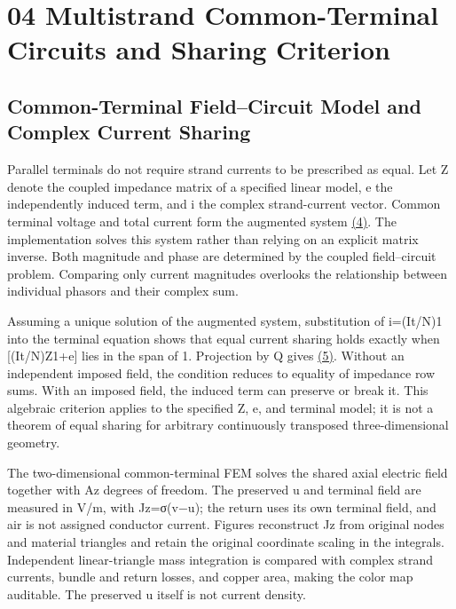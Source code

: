 \documentclass[journal,10pt]{IEEEtran}
\begin{document}
\section*{04 Multistrand Common-Terminal Circuits and Sharing Criterion}
\hypertarget{chapter-04}{}
\subsection*{Common-Terminal Field–Circuit Model and Complex Current Sharing}
\hypertarget{04.common.heading}{}
Parallel terminals do not require strand currents to be prescribed as equal. Let Z denote the coupled impedance matrix of a specified linear model, e the independently induced term, and i the complex strand-current vector. Common terminal voltage and total current form the augmented system \href{report_en_ieee.pdf#E04}{(4)}. The implementation solves this system rather than relying on an explicit matrix inverse. Both magnitude and phase are determined by the coupled field–circuit problem. Comparing only current magnitudes overlooks the relationship between individual phasors and their complex sum.


Assuming a unique solution of the augmented system, substitution of i=(It/N)1 into the terminal equation shows that equal current sharing holds exactly when [(It/N)Z1+e] lies in the span of 1. Projection by Q gives \href{report_en_ieee.pdf#E05}{(5)}. Without an independent imposed field, the condition reduces to equality of impedance row sums. With an imposed field, the induced term can preserve or break it. This algebraic criterion applies to the specified Z, e, and terminal model; it is not a theorem of equal sharing for arbitrary continuously transposed three-dimensional geometry.


The two-dimensional common-terminal FEM solves the shared axial electric field together with Az degrees of freedom. The preserved u and terminal field are measured in V/m, with Jz=σ(v−u); the return uses its own terminal field, and air is not assigned conductor current. Figures reconstruct Jz from original nodes and material triangles and retain the original coordinate scaling in the integrals. Independent linear-triangle mass integration is compared with complex strand currents, bundle and return losses, and copper area, making the color map auditable. The preserved u itself is not current density.
\end{document}
